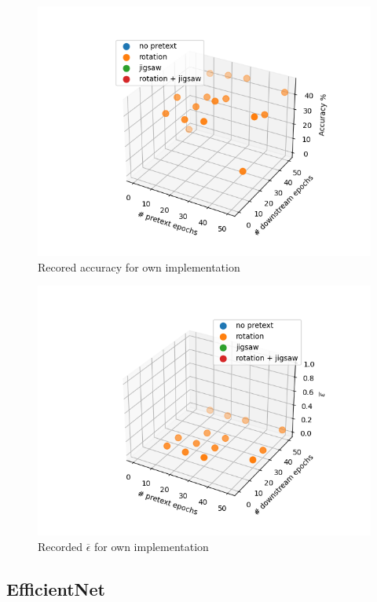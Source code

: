 \begin{figure}[!hb]
    \caption{Recored accuracy for own implementation}
    \centering
    \includegraphics[width=\textwidth]{images/basic_convolutional_network_acc}
\end{figure}

\begin{figure}[!ht]
    \caption{Recorded $\overline{\epsilon}$ for own implementation}
    \centering
    \includegraphics[width=\textwidth]{images/basic_convolutional_network_eps}
\end{figure}




\newpage

\subsection{EfficientNet}


